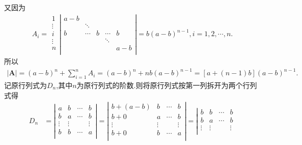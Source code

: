 \documentclass[lang=cn,newtx,10pt,scheme=chinese]{elegantbook}
\begin{document}
\begin{note}
又因为
\begin{align*}
    A_i=\begin{array}{l}
        1\\
        \vdots\\
        i\\
        \vdots\\
        n\\
    \end{array}\left| \begin{matrix}
        a-b&		&		&		&		\\
        &		\ddots&		&		&		\\
        b&		\cdots&		b&		\cdots&		b\\
        &		&		&		\ddots&		\\
        &		&		&		&		a-b\\
    \end{matrix} \right|=b\left( a-b \right) ^{n-1},i=1,2,\cdots ,n. 
\end{align*}
所以
\begin{align*}
    |\boldsymbol{A}|=\left( a-b \right) ^n+\sum_{i=1}^n{A_i}=\left( a-b \right) ^n+nb\left( a-b \right) ^{n-1}=\left[ a+\left( n-1 \right) b \right] \left( a-b \right) ^{n-1}.
\end{align*}
    {\color{blue}}
记原行列式为$D_n$,其中$n$为原行列式的阶数.则将原行列式按第一列拆开为两个行列式得
\begin{align*}
    D_n&=\left| \begin{matrix}
        a&		b&		\cdots&		b\\
        b&		a&		\cdots&		b\\
        \vdots&		\vdots&		&		\vdots\\
        b&		b&		\cdots&		a\\
    \end{matrix} \right|=\left| \begin{matrix}
        b+\left( a-b \right)&		b&		\cdots&		b\\
        b+0&		a&		\cdots&		b\\
        \vdots&		\vdots&		&		\vdots\\
        b+0&		b&		\cdots&		a\\
    \end{matrix} \right|=\left| \begin{matrix}
        b&		b&		\cdots&		b\\
        b&		a&		\cdots&		b\\
        \vdots&		\vdots&		&		\vdots\\

\end{matrix}
\end{align*}
\end{note}
\end{document}
